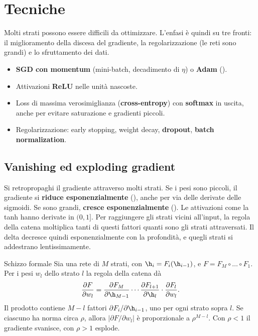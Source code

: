 \section{Tecniche}
\label{sec:tecniche-deep}

Molti strati possono essere difficili da ottimizzare. L'enfasi è quindi su tre fronti: il miglioramento della
discesa del gradiente, la regolarizzazione (le reti sono grandi) e lo sfruttamento dei dati.

\begin{idea}
\begin{itemize}
  \item \textbf{SGD con momentum} (mini-batch, decadimento di $\eta$) o \textbf{Adam} ().
  \item Attivazioni \textbf{ReLU} nelle unità nascoste.
  \item Loss di massima verosimiglianza (\textbf{cross-entropy}) con \textbf{softmax} in uscita, anche per evitare
        saturazione e gradienti piccoli.
  \item Regolarizzazione: early stopping, weight decay, \textbf{dropout}, \textbf{batch normalization}.
\end{itemize}
\end{idea}

\subsection{Vanishing ed exploding gradient}

Si retropropaghi il gradiente attraverso molti strati. Se i pesi sono piccoli, il gradiente si \textbf{riduce
esponenzialmente} (), anche per via delle derivate delle sigmoidi. Se sono grandi,
\textbf{cresce esponenzialmente} (). Le attivazioni come la tanh hanno derivate in
$(0,1]$. Per raggiungere gli strati vicini all'input, la regola della catena moltiplica tanti di questi fattori
quanti sono gli strati attraversati. Il delta decresce quindi esponenzialmente con la profondità, e quegli strati si
addestrano lentissimamente.

\begin{proprieta}{Schizzo formale}
Sia una rete di $M$ strati, con $\h_i = F_i(\h_{i-1})$, e $F = F_M\circ\dots\circ F_1$. Per i pesi $w_l$ dello strato
$l$ la regola della catena dà
\[
\frac{\partial F}{\partial w_l} = \frac{\partial F_M}{\partial\h_{M-1}}\cdots\frac{\partial F_{l+1}}{\partial\h_l}\cdot\frac{\partial F_l}{\partial w_l}.
\]
Il prodotto contiene $M-l$ fattori $\partial F_i/\partial\h_{i-1}$, uno per ogni strato sopra $l$. Se ciascuno ha
norma circa $\rho$, allora $\lvert\partial F/\partial w_l\rvert$ è proporzionale a $\rho^{M-l}$. Con $\rho<1$ il
gradiente svanisce, con $\rho>1$ esplode.
\end{proprieta}

